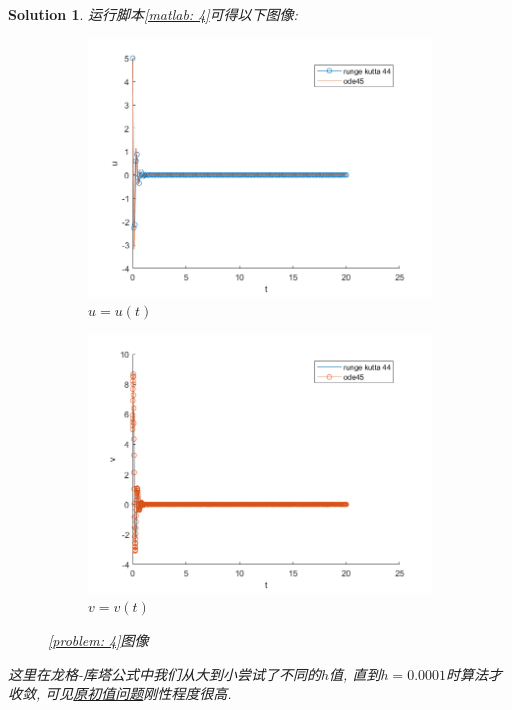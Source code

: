 \documentclass[a4paper, 12pt]{ctexart}
\theoremstyle{plain}
\theoremstyle{plain}
\theoremstyle{plain}
\theoremstyle{nonumberplain}
\newtheorem{solution}{Solution}
\begin{document}
    \begin{solution}
        运行脚本\ref{matlab: 4}可得以下图像:
        \begin{figure}[H]
            \centering
            \begin{subfigure}[b]{0.45\textwidth}
                \centering
                \includegraphics[width=\textwidth]{wc31.png}
                \caption{$u=u(t)$}
            \end{subfigure}
            \hfill
            \begin{subfigure}[b]{0.45\textwidth}
                \centering
                \includegraphics[width=\textwidth]{wc32.png}
                \caption{$v=v(t)$}
            \end{subfigure}
            \caption{\ref{problem: 4}图像}
       \end{figure}
       这里在龙格-库塔公式中我们从大到小尝试了不同的$h$值, 直到$h=0.0001$时算法才收敛, 可见\hyperref[equation: problem4]{原初值问题}刚性程度很高.
    \end{solution}
\end{document}
